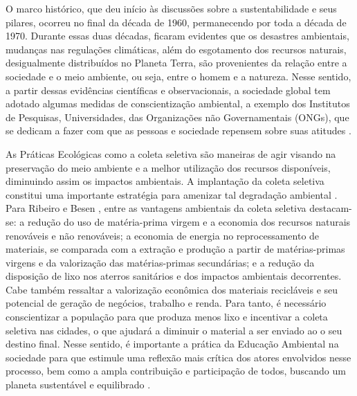 \documentclass[
	12pt,				%
	openany,			%
	twoside,			%
	a4paper,			%
	english,			%
	french,				%
	spanish,			%
	brazil				%
	]{abntex2}
\begin{document}
O marco histórico, que deu início às discussões sobre a sustentabilidade e seus pilares, ocorreu no final da década de 1960, permanecendo por toda a década de 1970. Durante essas duas décadas, ficaram evidentes que os desastres ambientais, mudanças nas regulações climáticas, além do esgotamento dos recursos naturais, desigualmente distribuídos no Planeta Terra, são provenientes da relação entre a sociedade e o meio ambiente, ou seja, entre o homem e a natureza. Nesse sentido, a partir dessas evidências científicas e observacionais, a sociedade global tem adotado algumas medidas de conscientização ambiental, a exemplo dos Institutos de Pesquisas, Universidades, das Organizações não Governamentais (ONGs), que se dedicam a fazer com que as pessoas e sociedade repensem sobre suas atitudes \cite{phsr}. 

As Práticas Ecológicas como a coleta seletiva são maneiras de agir visando na preservação do meio ambiente e a melhor utilização dos recursos disponíveis, diminuindo assim os impactos ambientais. A implantação da coleta seletiva constitui uma importante estratégia para amenizar tal degradação ambiental \cite{vos}. 
Para Ribeiro e Besen \cite{grbhr} , entre as vantagens ambientais da coleta seletiva destacam-se: a redução do uso de matéria-prima virgem e a economia dos recursos naturais renováveis e não renováveis; a economia de energia no reprocessamento de materiais, se comparada com a extração e produção a partir de matérias-primas virgens e da valorização das matérias-primas secundárias; e a redução da disposição de lixo nos aterros sanitários e dos impactos ambientais decorrentes. Cabe também ressaltar a valorização econômica dos materiais recicláveis e seu potencial de geração de negócios, trabalho e renda.
Para tanto, é necessário conscientizar a população para que produza menos lixo e incentivar a coleta seletiva nas cidades, o que ajudará a diminuir o material a ser enviado ao o seu destino final. Nesse sentido, é importante a prática da Educação Ambiental na sociedade para que estimule uma reflexão mais crítica dos atores envolvidos nesse processo, bem como a ampla contribuição e participação de todos, buscando um planeta sustentável e equilibrado \cite{srvct}. 
\end{document}

